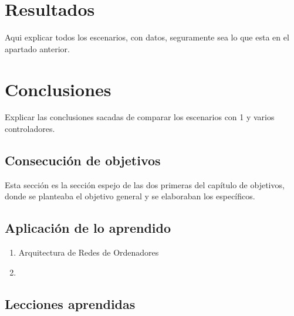 \documentclass[a4paper, 12pt]{book}
\begin{document}
	
	\cleardoublepage
	\chapter{Resultados}
	\label{chap:resultados}
	
 
 	Aqui explicar todos los escenarios, con datos, seguramente sea lo que esta en el apartado anterior.
	
	
	
	\cleardoublepage
	\chapter{Conclusiones}
	\label{chap:conclusiones}
	
	Explicar las conclusiones sacadas de comparar los escenarios con 1 y varios controladores.
	
	\section{Consecución de objetivos}
	\label{sec:consecucion-objetivos}
	
	Esta sección es la sección espejo de las dos primeras del capítulo de objetivos, donde se planteaba el objetivo general y se elaboraban los específicos.
	
	\section{Aplicación de lo aprendido}
	\label{sec:aplicacion}
	
	\begin{enumerate}
		\item Arquitectura de Redes de Ordenadores
		\item 
	\end{enumerate}
	
	
	\section{Lecciones aprendidas}
	\label{sec:lecciones_aprendidas}
	
\end{document}
